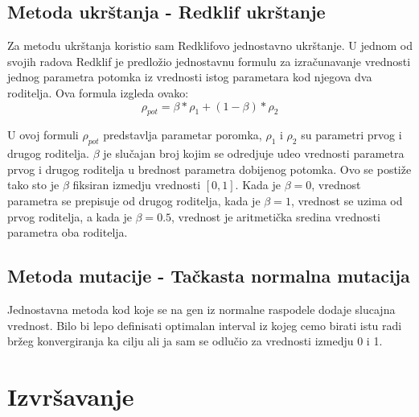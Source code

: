 \documentclass[a4paper,11pt]{book}
\begin{document}
\section{Metoda ukrštanja - Redklif ukrštanje}

Za metodu ukrštanja koristio sam Redklifovo jednostavno ukrštanje. U jednom od svojih radova Redklif je predložio jednostavnu formulu za izračunavanje vrednosti jednog parametra potomka iz vrednosti istog parametara kod njegova dva roditelja. Ova formula izgleda ovako:
\[\rho_{pot} = \beta * \rho_{1} + (1-\beta) * \rho_{2}\]

U ovoj formuli $\rho_{pot}$ predstavlja parametar poromka, $\rho_{1}$ i $\rho_{2}$ su parametri prvog i drugog roditelja. $\beta$ je slučajan broj kojim se odredjuje udeo vrednosti parametra prvog i drugog roditelja u brednost parametra dobijenog potomka. Ovo se postiže tako sto je $\beta$ fiksiran izmedju vrednosti $[0,1]$. Kada je $\beta=0$, vrednost parametra se prepisuje od drugog roditelja, kada je $\beta=1$, vrednost se uzima od prvog roditelja, a kada je $\beta=0.5$, vrednost je aritmetička sredina vrednosti parametra oba roditelja.

\section{Metoda mutacije - Tačkasta normalna mutacija}

Jednostavna metoda kod koje se na gen iz normalne raspodele dodaje slucajna vrednost. Bilo bi lepo definisati optimalan interval iz kojeg cemo birati istu radi bržeg konvergiranja ka cilju ali ja sam se odlučio za vrednosti izmedju 0 i 1.

\chapter{Izvršavanje}
\end{document}

